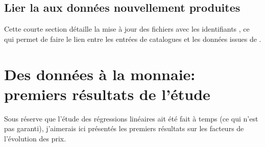 \subsection{Lier la \tei{} aux données nouvellement produites}
Cette courte section détaille la mise à jour des fichiers \tei{} avec les identifiants \wkd{}, ce qui permet de faire le lien entre les entrées de catalogues et les données issues de \wkd{}.

\section{Des données à la monnaie: premiers résultats de l'étude}
Sous réserve que l'étude des régressions linéaires ait été fait à temps (ce qui n'est pas garanti), j'aimerais ici présentés les premiers résultats sur les facteurs de l'évolution des prix.
